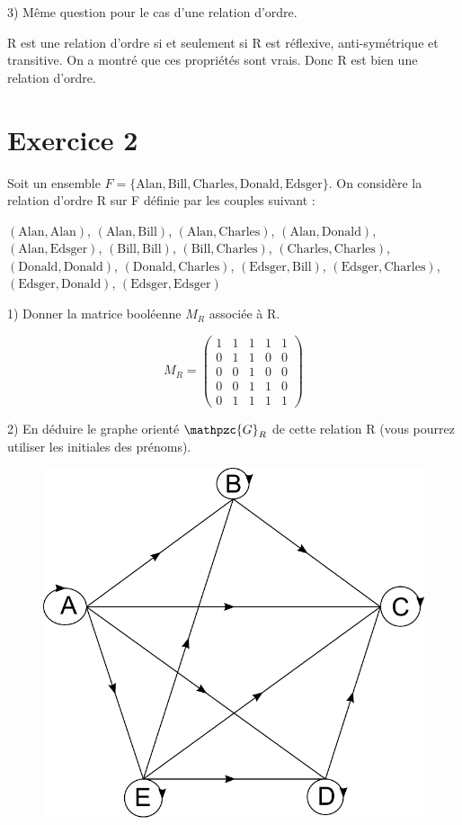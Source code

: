 \documentclass[a4paper,12pt]{article}
\begin{document}
3) Même question pour le cas d'une relation d'ordre.

R est une relation d'ordre si et seulement si R est réflexive, anti-symétrique et transitive. On a montré que ces propriétés sont vrais. Donc R est bien une relation d'ordre. 

\section*{Exercice 2}

Soit un ensemble $F = \{ \text{Alan}, \text{Bill}, \text{Charles}, \text{Donald}, \text{Edsger} \}$. On considère la relation d'ordre R sur F définie par les couples suivant :

$(\text{Alan}, \text{Alan})$, $(\text{Alan}, \text{Bill})$, $(\text{Alan}, \text{Charles})$, $(\text{Alan}, \text{Donald})$, $(\text{Alan}, \text{Edsger})$, $(\text{Bill}, \text{Bill})$, $(\text{Bill}, \text{Charles})$, $(\text{Charles}, \text{Charles})$, $(\text{Donald}, \text{Donald})$, $(\text{Donald}, \text{Charles})$, $(\text{Edsger}, \text{Bill})$, $(\text{Edsger}, \text{Charles})$, $(\text{Edsger}, \text{Donald})$, $(\text{Edsger}, \text{Edsger})$


1) Donner la matrice booléenne $M_R$ associée à R.

$$M_R = \left( \begin{array}{ccccc}
1&1&1&1&1\\
0&1&1&0&0\\
0&0&1&0&0\\
0&0&1&1&0\\
0&1&1&1&1
\end{array}\right)
$$

2) En déduire le graphe orienté $\mathpzc{G}_R$ de cette relation R (vous pourrez utiliser les initiales des prénoms).

\begin{figure}[hr!]
  \centering
    \includegraphics[width=.5\linewidth]{./exo2-graphe.pdf}
\end{figure}
\end{document}
